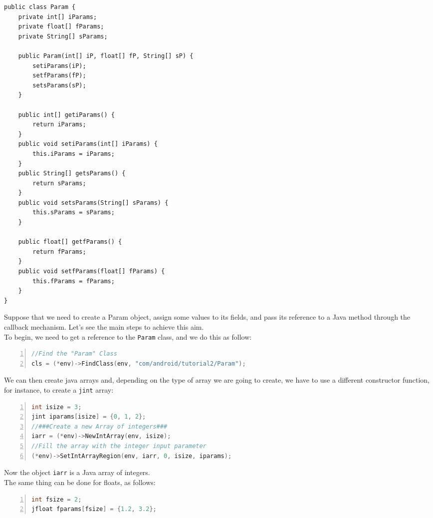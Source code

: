 \documentclass[a4paper,10pt]{article}
\newcommand{\keyword}[1]{\texttt{#1}}
\begin{document}
\begin{multicols}{2}
\begin{lstlisting}
public class Param {
	private int[] iParams;
	private float[] fParams;
	private String[] sParams;

	public Param(int[] iP, float[] fP, String[] sP) {
		setiParams(iP);
		setfParams(fP);
		setsParams(sP);
	}

	public int[] getiParams() {
		return iParams;
	}
	public void setiParams(int[] iParams) {
		this.iParams = iParams;
	}
	public String[] getsParams() {
		return sParams;
	}
	public void setsParams(String[] sParams) {
		this.sParams = sParams;
	}

	public float[] getfParams() {
		return fParams;
	}
	public void setfParams(float[] fParams) {
		this.fParams = fParams;
	}
}
\end{lstlisting}
Suppose that we need to create a Param object, assign some values to its fields,
and pass its reference to a Java method through the callback mechanism. Let's
see the main steps to achieve this aim.\\
To begin, we need to get a reference to the \keyword{Param} class, and we do
this as follow:
\begin{lstlisting}[language=C,
				   columns=fullflexible,
				   showstringspaces=false,
				   xleftmargin=15pt,
				   frame = l,
				   numbers=left,
				   commentstyle=\color{gray}\upshape]
//Find the "Param" Class
cls = (*env)->FindClass(env, "com/android/tutorial2/Param");
\end{lstlisting}
We can then create java arrays and, depending on the type of array we are going
to create, we have to use a different constructor function, for instance, to
create a \keyword{jint} array:
\begin{lstlisting}[language=C,
				   columns=fullflexible,
				   showstringspaces=false,
				   xleftmargin=15pt,
				   frame = l,
				   numbers=left,
				   commentstyle=\color{gray}\upshape]
int isize = 3;
jint iparams[isize] = {0, 1, 2};
//###Create a new Array of integers###
iarr = (*env)->NewIntArray(env, isize);
//Fill the array with the integer input parameter
(*env)->SetIntArrayRegion(env, iarr, 0, isize, iparams);
\end{lstlisting}
Now the object \keyword{iarr} is a Java array of integers.\\
The same thing can be done for floats, as follows:
\begin{lstlisting}[language=C,
				   columns=fullflexible,
				   showstringspaces=false,
				   xleftmargin=15pt,
				   frame = l,
				   numbers=left,
				   commentstyle=\color{gray}\upshape]
int fsize = 2;
jfloat fparams[fsize] = {1.2, 3.2};

\end{lstlisting}
\end{multicols}
\end{document}
